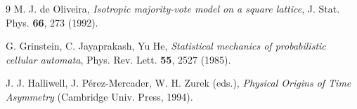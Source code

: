 \documentclass[11pt]{article}
\begin{document}
\begin{thebibliography}{9}
 M. J. de Oliveira, \emph{Isotropic majority-vote
model on a square lattice}, J. Stat. Phys. \textbf{66}, 273 (1992).

 G. Grinstein, C. Jayaprakash, Yu He, \emph{Statistical
mechanics of probabilistic cellular automata}, Phys. Rev. Lett.
\textbf{55}, 2527 (1985).

 J. J. Halliwell, J. P\'erez-Mercader, W. H. Zurek
(eds.), \emph{Physical Origins of Time Asymmetry} (Cambridge Univ. Press,
1994).

\end{thebibliography}
\end{document}
